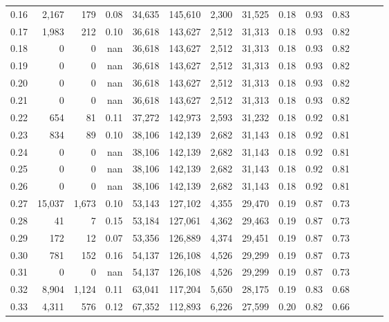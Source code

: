 \begin{tabular}{rrrrrrrrrrrrrr}
0.16 &   2,167 &    179 &  0.08 &   34,635 &  145,610 &   2,300 &  31,525 &  0.18 &  0.93 &      0.83 \\
0.17 &   1,983 &    212 &  0.10 &   36,618 &  143,627 &   2,512 &  31,313 &  0.18 &  0.93 &      0.82 \\
0.18 &       0 &      0 &   nan &   36,618 &  143,627 &   2,512 &  31,313 &  0.18 &  0.93 &      0.82 \\
0.19 &       0 &      0 &   nan &   36,618 &  143,627 &   2,512 &  31,313 &  0.18 &  0.93 &      0.82 \\
0.20 &       0 &      0 &   nan &   36,618 &  143,627 &   2,512 &  31,313 &  0.18 &  0.93 &      0.82 \\
0.21 &       0 &      0 &   nan &   36,618 &  143,627 &   2,512 &  31,313 &  0.18 &  0.93 &      0.82 \\
0.22 &     654 &     81 &  0.11 &   37,272 &  142,973 &   2,593 &  31,232 &  0.18 &  0.92 &      0.81 \\
0.23 &     834 &     89 &  0.10 &   38,106 &  142,139 &   2,682 &  31,143 &  0.18 &  0.92 &      0.81 \\
0.24 &       0 &      0 &   nan &   38,106 &  142,139 &   2,682 &  31,143 &  0.18 &  0.92 &      0.81 \\
0.25 &       0 &      0 &   nan &   38,106 &  142,139 &   2,682 &  31,143 &  0.18 &  0.92 &      0.81 \\
0.26 &       0 &      0 &   nan &   38,106 &  142,139 &   2,682 &  31,143 &  0.18 &  0.92 &      0.81 \\
0.27 &  15,037 &  1,673 &  0.10 &   53,143 &  127,102 &   4,355 &  29,470 &  0.19 &  0.87 &      0.73 \\
0.28 &      41 &      7 &  0.15 &   53,184 &  127,061 &   4,362 &  29,463 &  0.19 &  0.87 &      0.73 \\
0.29 &     172 &     12 &  0.07 &   53,356 &  126,889 &   4,374 &  29,451 &  0.19 &  0.87 &      0.73 \\
0.30 &     781 &    152 &  0.16 &   54,137 &  126,108 &   4,526 &  29,299 &  0.19 &  0.87 &      0.73 \\
0.31 &       0 &      0 &   nan &   54,137 &  126,108 &   4,526 &  29,299 &  0.19 &  0.87 &      0.73 \\
0.32 &   8,904 &  1,124 &  0.11 &   63,041 &  117,204 &   5,650 &  28,175 &  0.19 &  0.83 &      0.68 \\
0.33 &   4,311 &    576 &  0.12 &   67,352 &  112,893 &   6,226 &  27,599 &  0.20 &  0.82 &      0.66 \\

\end{tabular}
